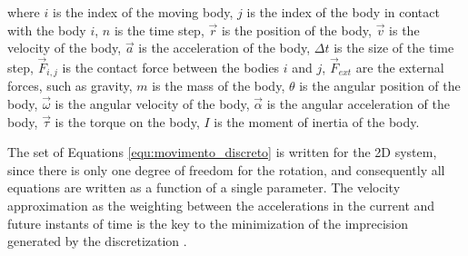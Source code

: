where $i$ is the index of the moving body, $j$ is the index of the body in contact with the body $i$, $n$ is the time step, $\vec{r}$ is the position of the body, $\vec{v}$ is the velocity of the body, $\vec{a}$ is the acceleration of the body, $\Delta t$ is the size of the time step, $\vec{F}_{i,j}$ is the contact force between the bodies $i$ and $j$, $\vec{F}_{ext}$ are the external forces, such as gravity, $m$ is the mass of the body, $\theta$ is the angular position of the body, $\vec{\omega}$ is the angular velocity of the body, $\vec{\alpha}$ is the angular acceleration of the body, $\vec{\tau}$ is the torque on the body, $I$ is the moment of inertia of the body. 


    The set of Equations \ref{equ:movimento_discreto} is written for the 2D system, since there is only one degree of freedom for the rotation, and consequently all equations are written as a function of a single parameter. The velocity approximation as the weighting between the accelerations in the current and future instants of time is the key to the minimization of the imprecision generated by the discretization \cite{Computer_Simulation_of_Liquids}.

